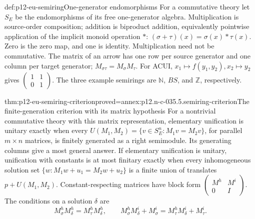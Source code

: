 \begin{hbdefinition}{def:p12-eu-semiring}{One-generator endomorphisms}
For a commutative theory let \(S_E\) be the endomorphisms of its free
one-generator algebra. Multiplication is source-order composition;
addition is biproduct addition, equivalently pointwise application of
the implicit monoid operation \(*\):
\((\sigma+\tau)(x)=\sigma(x)*\tau(x)\). Zero is the zero map,
and one is identity. Multiplication need not be commutative.
The matrix of an arrow has one row per source generator and one column
per target generator; \(M_{\sigma\tau}=M_\sigma M_\tau\).
For ACUI, \(x_1\mapsto f(y_1,y_2),x_2\mapsto y_2\) gives
\(\left(\begin{smallmatrix}1&1\\0&1\end{smallmatrix}\right)\).
The three example semirings are \(\mathbb N\), \(BS\), and
\(\mathbb Z\), respectively. \cite[\S5.3, p.~510]{BaaderSnyder2001}
\end{hbdefinition}

\begin{hbtheorem}{thm:p12-eu-semiring-criterion}{proved=annex:p12.n-c-035.5.semiring-criterion}{The finite-generation criterion with its matrix hypothesis}
For a nontrivial commutative theory with this matrix representation,
elementary unification is unitary exactly when every
\(U(M_1,M_2)=\{v\in S_E^n:M_1v=M_2v\}\), for parallel
\(m\times n\) matrices, is finitely generated as a right semimodule.
Its generating columns give a most general answer.
If elementary unification is unitary, unification with constants is
at most finitary exactly when every inhomogeneous solution set
\(\{w:M_1w+u_1=M_2w+u_2\}\) is a finite union of translates
\(p+U(M_1,M_2)\). Constant-respecting matrices have block form
\(\left(\begin{smallmatrix}M^h&M^i\\0&I\end{smallmatrix}\right)\).
The conditions on a solution \(\delta\) are
\[
 M_\sigma^hM_\delta^h=M_\tau^hM_\delta^h,
 \qquad M_\sigma^hM_\delta^i+M_\sigma^i
       =M_\tau^hM_\delta^i+M_\tau^i.
\]
\cite[Theorems 5.4--5.5, pp.~511--512]{BaaderSnyder2001}
\end{hbtheorem}



